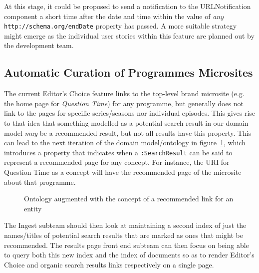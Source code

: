 At this stage, it could
be proposed to send a notification to the URLNotification
component a short time after the date and time within the
value of \emph{any}
\texttt{http://schema.org/endDate} property has passed. A more
suitable strategy might emerge as the individual user stories
within this feature are planned out by the development team.

\subsection{Automatic Curation of Programmes Microsites}

The current Editor's Choice feature links to the top-level
brand microsite (e.g. the home page for \emph{Question Time})
for any programme, but generally does not link to the pages
for specific series/seasons nor individual episodes. This gives
rise to that idea that something modelled as a potential
search result in our domain model \emph{may} be a recommended
result, but not all results have this property. This can
lead to the next iteration of the domain model/ontology in
figure~\ref{fig:recommended-ontology}, which introduces a
property that indicates when a \texttt{:SearchResult}
can be said to represent a recommended page for any concept.
For instance, the URI for Question Time as a concept
will have the recommended page of the microsite about that
programme.

\begin{figure}[t]
  \begin{center}
  \end{center}
  \caption{Ontology augmented with the concept of a recommended link for an entity}
  \label{fig:recommended-ontology}
\end{figure}

The Ingest subteam should then look at maintaining a second
index of just the names/titles of potential search results
that are marked as ones that might be recommended. The
results page front end subteam can then focus on being
able to query both this new index and the index of documents
so as to render Editor's Choice and organic search results
links respectively on a single page.

